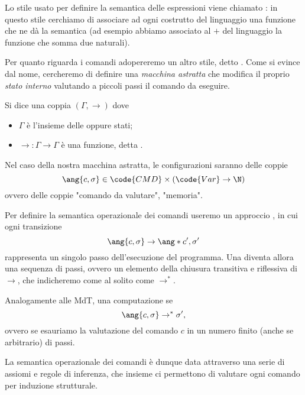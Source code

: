 Lo stile usato per definire la semantica delle espressioni viene chiamato : in questo stile cerchiamo di associare ad ogni costrutto del linguaggio una funzione che ne dà la semantica (ad esempio abbiamo associato al $+$ del linguaggio la funzione che somma due naturali).

Per quanto riguarda i comandi adopereremo un altro stile, detto . Come si evince dal nome, cercheremo di definire una \emph{macchina astratta} che modifica il proprio \emph{stato interno} valutando a piccoli passi il comando da eseguire.

\begin{definition}
    Si dice  una coppia $(\Gamma, \to)$ dove \begin{itemize}
        \item $\Gamma$ è l'insieme delle  oppure stati;
        \item $\to : \Gamma \to \Gamma$ è una funzione, detta . 
    \end{itemize} 
\end{definition}

Nel caso della nostra macchina astratta, le configurazioni saranno delle coppie \[
    \ang{c, \sigma} \in \code{CMD} \times (\code{Var} \to \N)
\] ovvero delle coppie "comando da valutare", "memoria".

Per definire la semantica operazionale dei comandi useremo un approccio , in cui ogni transizione \[
    \ang{c, \sigma} \to \ang*{c', \sigma'}
\] rappresenta un singolo passo dell'esecuzione del programma. Una  diventa allora una sequenza di passi, ovvero un elemento della chiusura transitiva e riflessiva di $\to$, che indicheremo come al solito come $\to^\ast$.

Analogamente alle MdT, una computazione  se \[
    \ang{c, \sigma} \to^\ast \sigma',
\] ovvero se esauriamo la valutazione del comando $c$ in un numero finito (anche se arbitrario) di passi.

La semantica operazionale dei comandi è dunque data attraverso una serie di assiomi e regole di inferenza, che insieme ci permettono di valutare ogni comando per induzione strutturale.

